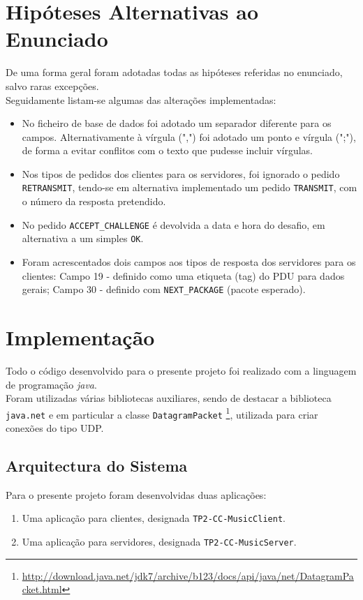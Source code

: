 \documentclass{llncs}
\begin{document}
\section{Hipóteses Alternativas ao Enunciado}
De uma forma geral foram adotadas todas as hipóteses referidas no enunciado, 
salvo raras excepções.\\

Seguidamente listam-se algumas das alterações implementadas:
\begin{itemize}
\item No ficheiro de base de dados foi adotado um separador diferente para os campos. 
		Alternativamente à vírgula (",") foi adotado um ponto e vírgula (";"), de forma a 
		evitar conflitos com o texto que pudesse incluir vírgulas.
\item Nos tipos de pedidos dos clientes para os servidores, foi ignorado o pedido 
		\verb!RETRANSMIT!, tendo-se em alternativa implementado um pedido \verb!TRANSMIT!, 
		com o número da resposta pretendido.
\item No pedido \verb!ACCEPT_CHALLENGE! é devolvida a data e hora do desafio, em alternativa 
		a um simples \verb!OK!.
\item Foram acrescentados dois campos aos tipos de resposta dos servidores para os clientes: 
		Campo 19 - definido como uma etiqueta (tag) do PDU para dados gerais;
		Campo 30 - definido com \verb!NEXT_PACKAGE! (pacote esperado).
\end{itemize}

\section{Implementação}
Todo o código desenvolvido para o presente projeto foi realizado com a linguagem de 
programação \emph{java}.\\

Foram utilizadas várias bibliotecas auxiliares, sendo de destacar a biblioteca 
\verb!java.net! e em particular a classe \verb!DatagramPacket! 
\footnote{\url{http://download.java.net/jdk7/archive/b123/docs/api/java/net/DatagramPacket.html}}, 
utilizada para criar conexões do tipo UDP.

\subsection{Arquitectura do Sistema}
Para o presente projeto foram desenvolvidas duas aplicações:
\begin{enumerate}
\item Uma aplicação para clientes, designada \verb!TP2-CC-MusicClient!.
\item Uma aplicação para servidores, designada \verb!TP2-CC-MusicServer!.
\end{enumerate}
\end{document}
